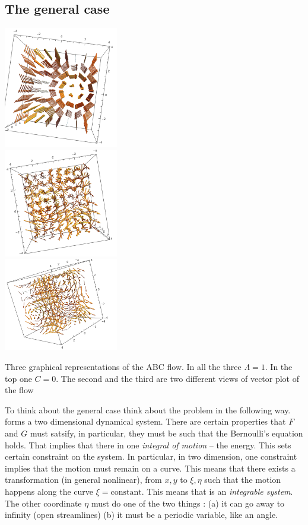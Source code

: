 \subsection{The general case}
\begin{marginfigure}
\includegraphics[width=5cm]{figures/ABC1.png}\\
\includegraphics[width=5cm]{figures/ABC2.png}\\
\includegraphics[width=5cm]{figures/ABC3.png}
\caption{Three graphical representations of the ABC flow. In all the
  three $\Lambda=1$. In the top one $C=0$. The second and the third
  are two different views of vector plot of the flow}
\label{fig:ABC}
\end{marginfigure}
To think about the general case think about the problem in the
following way.  forms a two dimensional dynamical
system. There are certain properties that $F$ and $G$ must satsify, in
particular, they must be such that the Bernoulli's equation
holds. That implies that there in one \textit{integral of motion} 
-- the energy. This sets
certain constraint on the system. In particular, in two dimension, one
constraint implies that the motion must remain on a curve. This means
that there exists a transformation (in general nonlinear), 
from $x,y$ to $\xi,\eta$ such that the motion happens along the curve
$\xi = \text{constant}$. This means that  is an 
\textit{integrable system}. The other coordinate $\eta$ must do one of
the two things : (a) it can go away to infinity (open streamlines) (b)
it must be a periodic variable, like an angle. 

